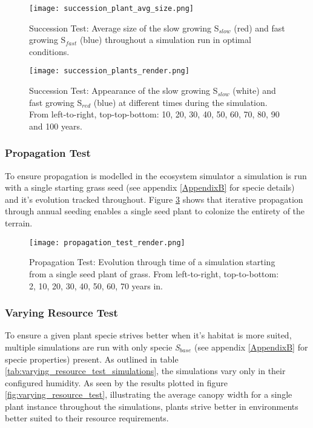 \begin{figure}
\center
	\texttt{[image: succession\_plant\_avg\_size.png]}
	\caption{ Succession Test: Average size of the slow growing S$_{slow}$ (red) and fast growing S$_{fast}$ (blue) throughout a simulation run in optimal conditions. }
	\label{fig:succession_plants_avg_size}
\end{figure}

\begin{figure}
\center
	\texttt{[image: succession\_plants\_render.png]}
	\caption{ Succession Test: Appearance of the slow growing S$_{slow}$ (white) and fast growing S$_{red}$ (blue) at different times during the simulation. From left-to-right, top-top-bottom: 10, 20, 30, 40, 50, 60, 70, 80, 90 and 100 years.}
	\label{fig:succession_plants_render}
\end{figure}

\subsubsection{Propagation Test}

To ensure propagation is modelled in the ecosystem simulator a simulation is run with a single starting grass seed (see appendix \ref{AppendixB} for specie details) and it's evolution tracked throughout. Figure \ref{fig:propagation_test_render} shows that iterative propagation through annual seeding enables a single seed plant to colonize the entirety of the terrain. 

\begin{figure}
\center
	\texttt{[image: propagation\_test\_render.png]}
	\caption{ Propagation Test: Evolution through time of a simulation starting from a single seed plant of grass. From left-to-right, top-to-bottom: 2, 10, 20, 30, 40, 50, 60, 70 years in.}
	\label{fig:propagation_test_render}
\end{figure}

\subsubsection{Varying Resource Test}

To ensure a given plant specie strives better when it's habitat is more suited, multiple simulations are run with only specie \textit{S$_{base}$} (see appendix \ref{AppendixB} for specie properties) present. As outlined in table \ref{tab:varying_resource_test_simulations}, the simulations vary only in their configured humidity. As seen by the results plotted in figure \ref{fig:varying_resource_test}, illustrating the average canopy width for a single plant instance throughout the simulations, plants strive better in environments better suited to their resource requirements.


